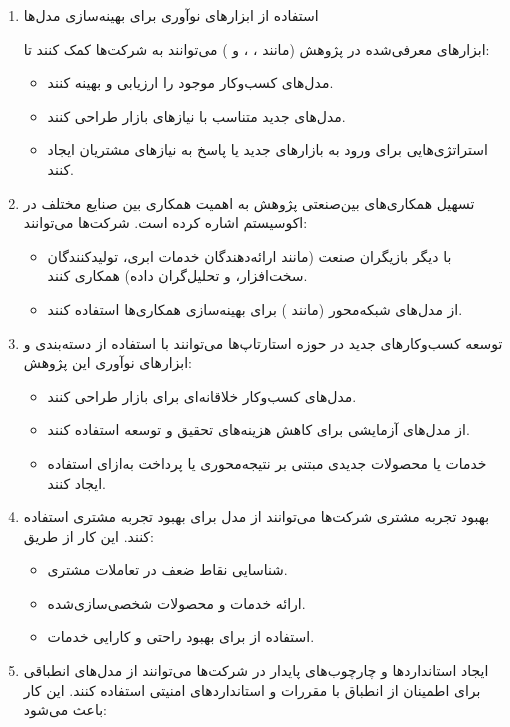 \documentclass[10pt, twocolumn]{article}
\begin{document}
\begin{enumerate}
\item 
استفاده از ابزارهای نوآوری برای بهینه‌سازی مدل‌ها  

ابزارهای معرفی‌شده در پژوهش 
(مانند
، 
، 
و
)
 می‌توانند به شرکت‌ها کمک کنند تا:  
\begin{itemize}
\item مدل‌های کسب‌وکار موجود را ارزیابی و بهینه کنند.  
\item مدل‌های جدید متناسب با نیازهای بازار  طراحی کنند.  
\item استراتژی‌هایی برای ورود به بازارهای جدید یا پاسخ به نیازهای مشتریان ایجاد کنند.  
\end{itemize}

\item 
تسهیل همکاری‌های بین‌صنعتی  
   پژوهش به اهمیت همکاری بین صنایع مختلف در اکوسیستم  اشاره کرده است. شرکت‌ها می‌توانند:  

\begin{itemize}
\item با دیگر بازیگران صنعت (مانند ارائه‌دهندگان خدمات ابری، تولیدکنندگان سخت‌افزار، و تحلیل‌گران داده) همکاری کنند.  
\item از مدل‌های شبکه‌محور (مانند ) برای بهینه‌سازی همکاری‌ها استفاده کنند.  
\end{itemize}

\item 
توسعه کسب‌وکارهای جدید در حوزه   
   استارتاپ‌ها می‌توانند با استفاده از دسته‌بندی و ابزارهای نوآوری این پژوهش:  

\begin{itemize}
\item مدل‌های کسب‌وکار خلاقانه‌ای برای بازار  طراحی کنند.  
\item از مدل‌های آزمایشی  برای کاهش هزینه‌های تحقیق و توسعه استفاده کنند.  
\item خدمات یا محصولات جدیدی مبتنی بر نتیجه‌محوری یا پرداخت به‌ازای استفاده ایجاد کنند.  
\end{itemize}

\item 
بهبود تجربه مشتری   
   شرکت‌ها می‌توانند از مدل  برای بهبود تجربه مشتری استفاده کنند. این کار از طریق:  

\begin{itemize}
\item شناسایی نقاط ضعف در تعاملات مشتری.  
\item ارائه خدمات و محصولات شخصی‌سازی‌شده.  
\item استفاده از  برای بهبود راحتی و کارایی خدمات.  
\end{itemize}
\item 
ایجاد استانداردها و چارچوب‌های پایدار در   
   شرکت‌ها می‌توانند از مدل‌های انطباقی برای اطمینان از انطباق با مقررات و استانداردهای امنیتی استفاده کنند. این کار باعث می‌شود:  


\end{enumerate}
\end{document}
